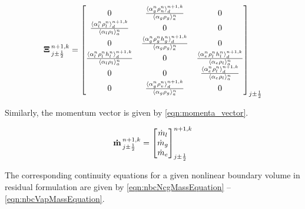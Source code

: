 \begin{equation}
\label{eqn:flux_matrix}
\vec{\Xi}^{n+1, k}_{j \pm \onehalf} = \begin{bmatrix}
%
 0 & \frac{\don{\alpha^{n}_{g} \rho^{n}_{n}}^{n+1,k}_{d}}{\ave{\alpha_{g} \rho_{g}}^{n}_{a}} & 0 \\
%
\frac{\don{\alpha^{n}_{l}\rho^{n}_{l}}^{n+1,k}_{d}}{\ave{\alpha_{l} \rho_{l}}^{n}_{a}} & 0 & 0 \\
%
0 & \frac{\don{\alpha^{n}_{g} \rho^{n}_{g} h^{n}_{g}}^{n+1,k}_{d}}{\ave{\alpha_{g} \rho_{g}}^{n}_{a}} & 0 \\
%
\frac{\don{\alpha^{n}_{l}\rho^{n}_{l} h^{n}_{l}}^{n+1,k}_{d}}{\ave{\alpha_{l} \rho_{l}}^{n}_{a}} & 0 & \frac{\don{\alpha^{n}_{e} \rho^{n}_{l} h^{n}_{l}}^{n+1, k}_{d}}{\ave{\alpha_{e} \rho_{l}}^{n}_{a}} \\
%
0 & 0 & \frac{ \don{\alpha^{n}_{e} \rho^{n}_{l}}^{n+1, k}_{d}}{ \ave{\alpha_{e} \rho_{l}}^{n}_{a}} \\
%
0 & \frac{ \don{\alpha^{n}_{g} \rho^{n}_{v}}^{n+1, k}_{d}}{ \ave{\alpha_{g} \rho_{g}}^{n}_{a}} & 0
\end{bmatrix}_{j \pm \onehalf}
\end{equation}

Similarly, the momentum vector is given by \eqref{eqn:momenta_vector}.

\begin{equation}
\label{eqn:momenta_vector}
\vec{\dot{m}}^{n+1, k}_{j \pm \onehalf} = \begin{bmatrix}
\dot{m}_{l} \\
\dot{m}_{g} \\
\dot{m}_{e}
\end{bmatrix}^{n+1, k}_{j \pm \onehalf}
\end{equation}

The corresponding continuity equations for a given nonlinear boundary volume in residual formulation are given by \eqref{eqn:nbcNcgMassEquation} -- \eqref{eqn:nbcVapMassEquation}.

